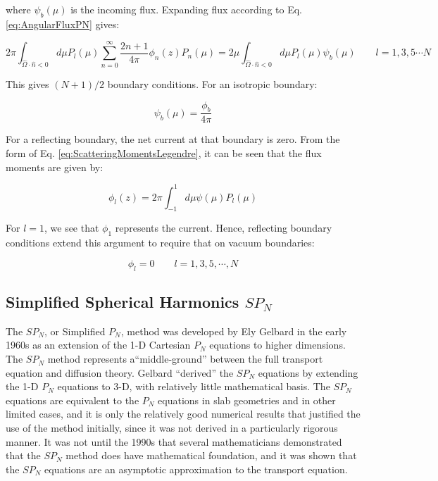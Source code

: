 \documentclass[10pt]{article}
\newcommand{\hO}{\hat{\Omega}}
\begin{document}
\begin{flushleft}
where \(\psi_b(\mu)\) is the incoming flux. Expanding flux according to Eq. \eqref{eq:AngularFluxPN} gives:

\begin{equation}
2\pi\int_{\hO  \cdot\hat{n}<0}^{}d\mu P_l(\mu)\sum_{n=0}^{\infty}\frac{2n+1}{4\pi}\phi_n(z)P_n(\mu)=2\mu\int_{\hO  \cdot\hat{n}<0}^{}d\mu P_l(\mu)\psi_b(\mu)\quad\quad l=1, 3, 5\cdots N
\end{equation}

This gives \((N+1)/2\) boundary conditions. For an isotropic boundary:

\begin{equation}
\psi_b(\mu)=\frac{\phi_b}{4\pi}
\end{equation}

For a reflecting boundary, the net current at that boundary is zero. From the form of Eq. \eqref{eq:ScatteringMomentsLegendre}, it can be seen that the flux moments are given by:

\begin{equation}
\phi_l(z)=2\pi\int_{-1}^{1}d\mu\psi(\mu)P_l(\mu)
\end{equation}

For \(l=1\), we see that \(\phi_1\) represents the current. Hence, reflecting boundary conditions extend this argument to require that on vacuum boundaries:

\begin{equation}
\phi_l=0\quad\quad l=1, 3, 5, \cdots, N
\end{equation}

\subsection{Simplified Spherical Harmonics \(SP_N\)}
\label{sec:SPN}

The \(SP_N\), or Simplified \(P_N\), method was developed by Ely Gelbard in the early 1960s as an extension of the 1-D Cartesian \(P_N\) equations to higher dimensions. The \(SP_N\) method represents a``middle-ground'' between the full transport equation and diffusion theory. Gelbard ``derived'' the \(SP_N\) equations by extending the 1-D \(P_N\) equations to 3-D, with relatively little mathematical basis. The \(SP_N\) equations are equivalent to the \(P_N\) equations in slab geometries and in other limited cases, and it is only the relatively good numerical results that justified the use of the method initially, since it was not derived in a particularly rigorous manner. It was not until the 1990s that several mathematicians demonstrated that the \(SP_N\) method does have mathematical foundation, and it was shown that the \(SP_N\) equations are an asymptotic approximation to the transport equation. 


\end{flushleft}
\end{document}
